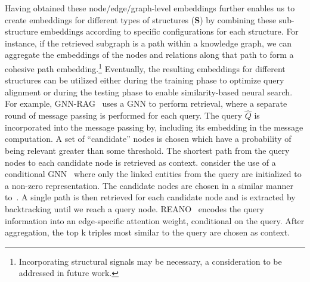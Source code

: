 Having obtained these node/edge/graph-level embeddings further enables us to create embeddings for different types of structures ($\mathbf{S}$) by combining these sub-structure embeddings according to specific configurations for each structure. For instance, if the retrieved subgraph is a path within a knowledge graph, we can aggregate the embeddings of the nodes and relations along that path to form a cohesive path embedding.\footnote{Incorporating structural signals may be necessary, a consideration to be addressed in future work.} Eventually, the resulting embeddings for different structures can be utilized either during the training phase to optimize query alignment or during the testing phase to enable similarity-based neural search. For example, GNN-RAG~\cite{sanmartin2024kg} uses a GNN to perform retrieval, where a separate round of message passing is performed for each query. The query $\hat{Q}$ is incorporated into the message passing by, including its embedding in the message computation. A set of ``candidate'' nodes is chosen which have a probability of being relevant greater than some threshold. The shortest path from the query nodes to each candidate node is retrieved as context. \citet{gnn_llm} consider the use of a conditional GNN~\cite{conditional_mpnn} where only the linked entities from the query are initialized to a non-zero representation. The candidate nodes are chosen in a similar manner to~\cite{sanmartin2024kg}. A single path is then retrieved for each candidate node and is extracted by backtracking until we reach a query node. REANO~\cite{fang2024reano} encodes the query information into an edge-specific attention weight, conditional on the query. After aggregation, the top k triples most similar to the query are chosen as context.




